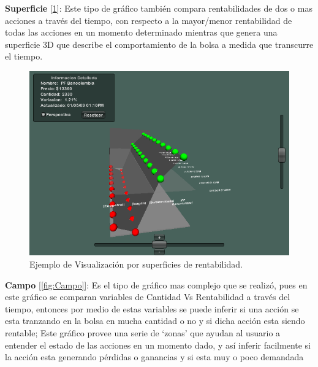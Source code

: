 \textbf{Superficie} [\ref{fig:Superficie}]: Este tipo de gráfico también compara rentabilidades de dos o mas acciones a través del tiempo, con respecto a la mayor/menor rentabilidad de todas las acciones en un momento determinado  mientras que genera una superficie 3D que describe el comportamiento de la bolsa a medida que transcurre el tiempo.\\

\begin{figure}[h]
	\centering
		\includegraphics[scale=0.5]{Superficie.png}
		\caption{Ejemplo de Visualización por superficies de rentabilidad.}
	\label{fig:Superficie}
\end{figure}

\textbf{Campo} [\ref{fig:Campo}]: Es el tipo de gráfico mas complejo que se realizó, pues en este gráfico se comparan variables de Cantidad Vs Rentabilidad a través del tiempo, entonces por medio de estas variables se puede inferir si una acción se esta tranzando en la bolsa en mucha cantidad o no y si dicha acción esta siendo rentable; Este gráfico provee una serie de `zonas' que ayudan al usuario a entender el estado de las acciones en un momento dado, y así inferir facilmente si la acción esta generando pérdidas o ganancias y si esta muy o poco demandada\\

